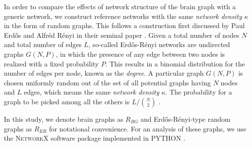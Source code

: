 \documentclass[fleqn,10pt]{wlpeerj}
\newcommand{\reg}[1]{~ \\ \textcolor{red}{\framebox{\begin{minipage}{0.9\linewidth}\footnotesize\em
#1  \end{minipage}}}\\}
\begin{document}
In order to compare the effects of network structure of the brain graph with a generic network, we construct reference
networks with the same \textit{network density} $\kappa$ in the form of random graphs. This follows a construction
first discussed by Paul Erd\H{o}s and Alfr\'{e}d R\'{e}nyi in their seminal paper  \citep{XYZERD}. Given a total number
of nodes $N$ and total number of edges $L$, so-called Erd\H{o}s-R\'{e}nyi networks are undirected graphs $G(N,P)$, in
which the presence of any edge between two nodes is realized with a fixed probability $P$. This results in a
binomial distribution for the number of edges per node, known as the \textit{degree}.  A particular graph $G(N,P)$ is
chosen uniformly random out of the set of all potential graphs having $N$ nodes and $L$ edges, which means the same
\textit{network density} $\kappa$. The probability for a graph to be picked among all the others is $L/\binom
{N}{2}$ \citep{NEW10}. 

In this study, we denote brain graphs as $R_{BG}$ and Erd\H{o}s-R\'{e}nyi-type random graphs as $R_{ER}$ for
notational convenience. For an analysis of these graphs, we use the \textsc{NetworkX} software package implemented in
\textsc{PYTHON} \citep{XYZNETW}.
\end{document}
